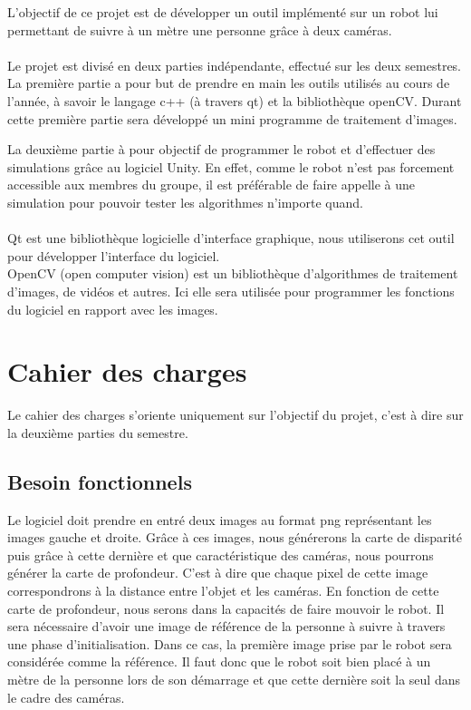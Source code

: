 \documentclass[12pt,a4paper]{report}
\begin{document}
L'objectif de ce projet est de développer un outil implémenté sur un robot lui permettant de suivre à un mètre une personne grâce à deux caméras.\\\\

Le projet est divisé en deux parties indépendante, effectué sur les deux semestres. 
La première partie a pour but de prendre en main les outils utilisés au cours de l'année, à savoir le langage c++ (à travers qt) et la bibliothèque openCV.
Durant cette première partie sera développé un mini programme de traitement d'images. 

La deuxième partie à pour objectif de programmer le robot et d'effectuer des simulations grâce au logiciel Unity. En effet, comme le robot n'est pas forcement accessible aux membres du groupe, il est préférable de faire appelle à une simulation pour pouvoir tester les algorithmes n'importe quand.\\\\

Qt est une bibliothèque logicielle d'interface graphique, nous utiliserons cet outil pour développer l'interface du logiciel.\\

OpenCV (open computer vision) est un bibliothèque d'algorithmes de traitement d'images, de vidéos et autres. Ici elle sera utilisée pour programmer les fonctions du logiciel en rapport avec les images.\\


\section{Cahier des charges}
Le cahier des charges s'oriente uniquement sur l'objectif du projet, c'est à dire sur la deuxième parties du semestre.
\subsection{Besoin fonctionnels}
	Le logiciel doit prendre en entré deux images au format png représentant les images gauche et droite.
	Grâce à ces images, nous générerons la carte de disparité puis grâce à cette dernière et que caractéristique des caméras, nous pourrons générer la carte de profondeur. C'est à dire que chaque pixel de cette image correspondrons à la distance entre l'objet et les caméras.
	En fonction de cette carte de profondeur, nous serons dans la capacités de faire mouvoir le robot.
	Il sera nécessaire d'avoir une image de référence de la personne à suivre à travers une phase d'initialisation. Dans ce cas, la première image prise par le robot sera considérée comme la référence. Il faut donc que le robot soit bien placé à un mètre de la personne lors de son démarrage et que cette dernière soit la seul dans le cadre des caméras.
\end{document}
